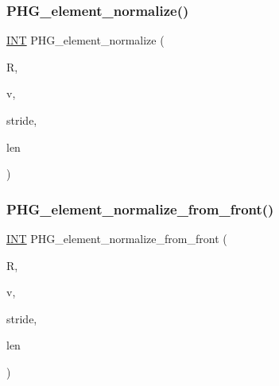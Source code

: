 \mbox{\label{projective_8_c_ac4e394a7350ec000268ab09fd04d4668}} 
\subsubsection{\texorpdfstring{P\+H\+G\+\_\+element\+\_\+normalize()}{PHG\_element\_normalize()}}
{\footnotesize\ttfamily \mbox{\hyperlink{galois_8h_a09fddde158a3a20bd2dcadb609de11dc}{I\+NT}} P\+H\+G\+\_\+element\+\_\+normalize (\begin{DoxyParamCaption}\item[{\mbox{\hyperlink{classfinite__ring}{finite\+\_\+ring}} \&}]{R,  }\item[{\mbox{\hyperlink{galois_8h_a09fddde158a3a20bd2dcadb609de11dc}{I\+NT}} $\ast$}]{v,  }\item[{\mbox{\hyperlink{galois_8h_a09fddde158a3a20bd2dcadb609de11dc}{I\+NT}}}]{stride,  }\item[{\mbox{\hyperlink{galois_8h_a09fddde158a3a20bd2dcadb609de11dc}{I\+NT}}}]{len }\end{DoxyParamCaption})}

\mbox{\label{projective_8_c_af6dd712cc781f6cfe0970353b9e6b750}} 
\subsubsection{\texorpdfstring{P\+H\+G\+\_\+element\+\_\+normalize\+\_\+from\+\_\+front()}{PHG\_element\_normalize\_from\_front()}}
{\footnotesize\ttfamily \mbox{\hyperlink{galois_8h_a09fddde158a3a20bd2dcadb609de11dc}{I\+NT}} P\+H\+G\+\_\+element\+\_\+normalize\+\_\+from\+\_\+front (\begin{DoxyParamCaption}\item[{\mbox{\hyperlink{classfinite__ring}{finite\+\_\+ring}} \&}]{R,  }\item[{\mbox{\hyperlink{galois_8h_a09fddde158a3a20bd2dcadb609de11dc}{I\+NT}} $\ast$}]{v,  }\item[{\mbox{\hyperlink{galois_8h_a09fddde158a3a20bd2dcadb609de11dc}{I\+NT}}}]{stride,  }\item[{\mbox{\hyperlink{galois_8h_a09fddde158a3a20bd2dcadb609de11dc}{I\+NT}}}]{len }\end{DoxyParamCaption})}

